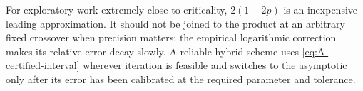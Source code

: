 For exploratory work extremely close to criticality,
\(2(1-2p)\) is an inexpensive leading approximation.  It should not be joined to
the product at an arbitrary fixed crossover when precision matters: the empirical
logarithmic correction makes its relative error decay slowly.  A reliable hybrid
scheme uses \eqref{eq:A-certified-interval} wherever iteration is feasible and
switches to the asymptotic only after its error has been calibrated at the required
parameter and tolerance.

\FloatBarrier
